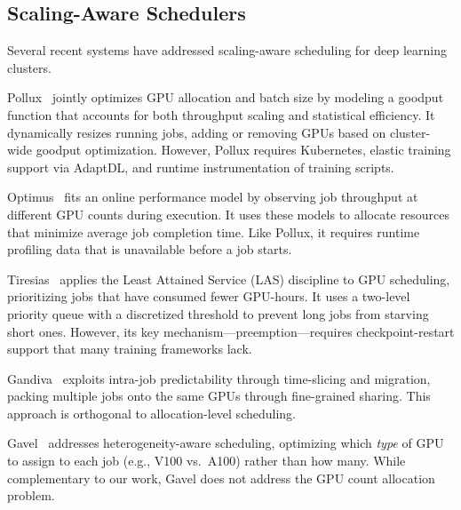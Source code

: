 \documentclass[letterpaper,10pt]{article}
\begin{document}
\subsection{Scaling-Aware Schedulers}

Several recent systems have addressed scaling-aware scheduling for deep learning clusters.

Pollux~\cite{pollux2021} jointly optimizes GPU allocation and batch size by modeling a goodput function that accounts for both throughput scaling and statistical efficiency. It dynamically resizes running jobs, adding or removing GPUs based on cluster-wide goodput optimization. However, Pollux requires Kubernetes, elastic training support via AdaptDL, and runtime instrumentation of training scripts.

Optimus~\cite{optimus2018} fits an online performance model by observing job throughput at different GPU counts during execution. It uses these models to allocate resources that minimize average job completion time. Like Pollux, it requires runtime profiling data that is unavailable before a job starts.

Tiresias~\cite{tiresias2019} applies the Least Attained Service (LAS) discipline to GPU scheduling, prioritizing jobs that have consumed fewer GPU-hours. It uses a two-level priority queue with a discretized threshold to prevent long jobs from starving short ones. However, its key mechanism---preemption---requires checkpoint-restart support that many training frameworks lack.

Gandiva~\cite{gandiva2018} exploits intra-job predictability through time-slicing and migration, packing multiple jobs onto the same GPUs through fine-grained sharing. This approach is orthogonal to allocation-level scheduling.

Gavel~\cite{gavel2020} addresses heterogeneity-aware scheduling, optimizing which \textit{type} of GPU to assign to each job (e.g., V100 vs.\ A100) rather than how many. While complementary to our work, Gavel does not address the GPU count allocation problem.
\end{document}

